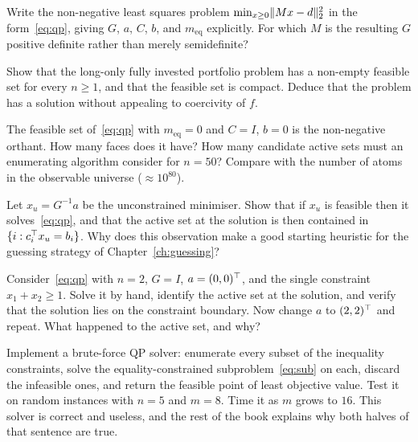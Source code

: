 \begin{exercises}

\begin{exercise}
Write the non-negative least squares problem $\min_{x\ge0}\lVert Mx-d \rVert_2^2$ in the
form~\eqref{eq:qp}, giving $G$, $a$, $C$, $b$, and $m_{\mathrm{eq}}$ explicitly.
For which $M$ is the resulting $G$ positive definite rather than merely
semidefinite?
\end{exercise}

\begin{exercise}
Show that the long-only fully invested portfolio problem has a non-empty feasible
set for every $n \ge 1$, and that the feasible set is compact. Deduce that the
problem has a solution without appealing to coercivity of $f$.
\end{exercise}

\begin{exercise}
The feasible set of~\eqref{eq:qp} with $m_{\mathrm{eq}} = 0$ and $C = I$, $b = 0$
is the non-negative orthant. How many faces does it have? How many candidate
active sets must an enumerating algorithm consider for $n = 50$? Compare with the
number of atoms in the observable universe ($\approx 10^{80}$).
\end{exercise}

\begin{exercise}
Let $x_u = G^{-1}a$ be the unconstrained minimiser. Show that if $x_u$ is
feasible then it solves~\eqref{eq:qp}, and that the active set at the solution is
then contained in $\{i : c_i^{\top} x_u = b_i\}$. Why does this observation make a good
starting heuristic for the guessing strategy of Chapter~\ref{ch:guessing}?
\end{exercise}

\begin{exercise}
Consider~\eqref{eq:qp} with $n = 2$, $G = I$, $a = (0,0)^{\top}$, and the single
constraint $x_1 + x_2 \ge 1$. Solve it by hand, identify the active set at the
solution, and verify that the solution lies on the constraint boundary. Now change
$a$ to $(2,2)^{\top}$ and repeat. What happened to the active set, and why?
\end{exercise}

\begin{exercise}[Implementation]
Implement a brute-force QP solver: enumerate every subset of the inequality
constraints, solve the equality-constrained subproblem~\eqref{eq:sub} on each,
discard the infeasible ones, and return the feasible point of least objective
value. Test it on random instances with $n = 5$ and $m = 8$. Time it as $m$ grows
to $16$. This solver is correct and useless, and the rest of the book explains
why both halves of that sentence are true.
\end{exercise}

\end{exercises}
